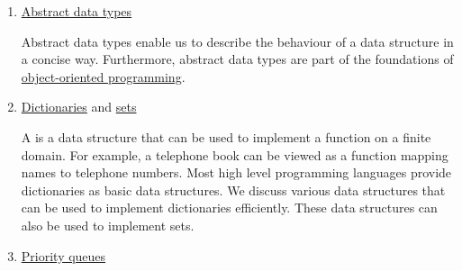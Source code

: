 \begin{enumerate}
      Sorting algorithms are among those algorithms that are most frequently used in practice.  Furthermore,
      these algorithms are both easy to understand and easy to analyse.  Therefore, we start our discussion of
      algorithms and their complexity with these algorithms.  In this lecture, we discuss the following
      sorting algorithms: 
      \begin{enumerate}
      \item \href{http://en.wikipedia.org/wiki/Insertion_sort}{insertion sort},
      \item \href{http://en.wikipedia.org/wiki/Merge_sort}{merge sort}, 
      \item \href{http://en.wikipedia.org/wiki/Quicksort}{quicksort}, 
      \item \href{http://en.wikipedia.org/wiki/Radix_sort}{radix sort}, 
      \item \href{https://en.wikipedia.org/wiki/Tree_sort}{tree sort}, and
      \item \href{https://en.wikipedia.org/wiki/Heapsort}{heapsort}.
      \end{enumerate}  
\item \href{http://en.wikipedia.org/wiki/Abstract_data_types}{Abstract data types}

      Abstract data types enable us to describe the behaviour of a data structure in a concise way.
      Furthermore, abstract data types are part of the foundations of 
      \href{https://en.wikipedia.org/wiki/Object-oriented_programming}{object-oriented programming}.
%  

\item \href{http://en.wikipedia.org/wiki/Map_(computer_science)}{Dictionaries} and \href{https://en.wikipedia.org/wiki/Set_(mathematics)}{sets}
  
      A  is a data structure that can be used to implement a function on a finite domain.
      For example, a telephone book can be viewed as a function mapping names to telephone numbers.
      Most high level programming languages provide dictionaries as basic data structures.  We discuss various data
      structures that can be used to implement dictionaries efficiently.   
      These data structures can also be used to implement sets.
\item \href{http://en.wikipedia.org/wiki/Priority_queue}{Priority queues}


\end{enumerate}
